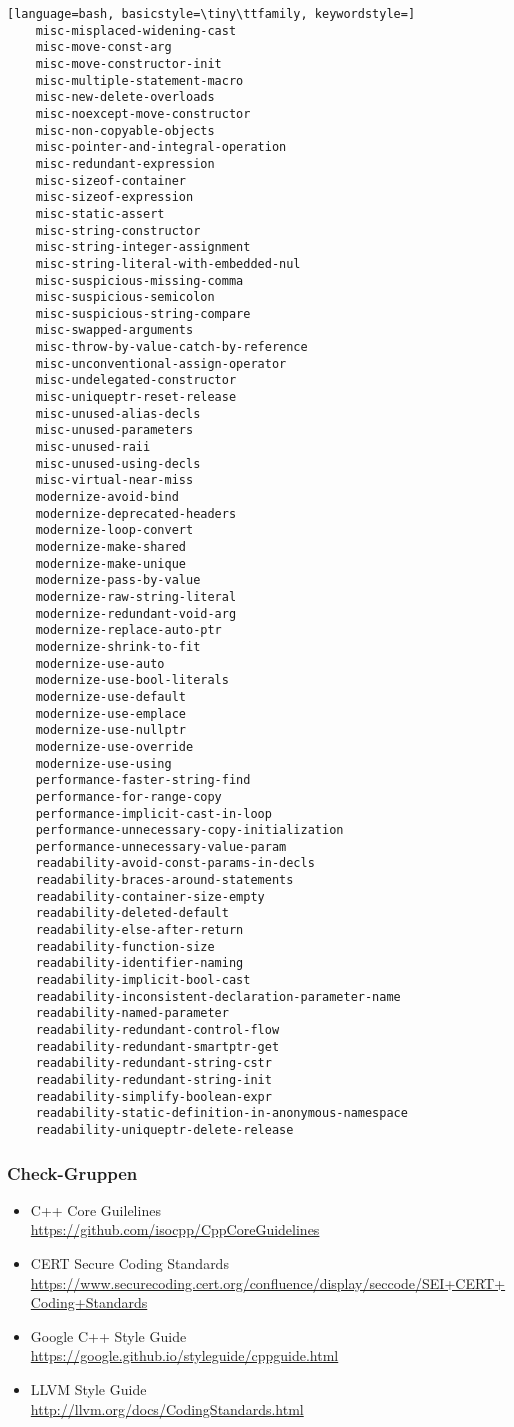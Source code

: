 \documentclass[aspectratio=169]{beamer}
\begin{document}
\begin{lstlisting}[language=bash, basicstyle=\tiny\ttfamily, keywordstyle=]
    misc-misplaced-widening-cast
    misc-move-const-arg
    misc-move-constructor-init
    misc-multiple-statement-macro
    misc-new-delete-overloads
    misc-noexcept-move-constructor
    misc-non-copyable-objects
    misc-pointer-and-integral-operation
    misc-redundant-expression
    misc-sizeof-container
    misc-sizeof-expression
    misc-static-assert
    misc-string-constructor
    misc-string-integer-assignment
    misc-string-literal-with-embedded-nul
    misc-suspicious-missing-comma
    misc-suspicious-semicolon
    misc-suspicious-string-compare
    misc-swapped-arguments
    misc-throw-by-value-catch-by-reference
    misc-unconventional-assign-operator
    misc-undelegated-constructor
    misc-uniqueptr-reset-release
    misc-unused-alias-decls
    misc-unused-parameters
    misc-unused-raii
    misc-unused-using-decls
    misc-virtual-near-miss
    modernize-avoid-bind
    modernize-deprecated-headers
    modernize-loop-convert
    modernize-make-shared
    modernize-make-unique
    modernize-pass-by-value
    modernize-raw-string-literal
    modernize-redundant-void-arg
    modernize-replace-auto-ptr
    modernize-shrink-to-fit
    modernize-use-auto
    modernize-use-bool-literals
    modernize-use-default
    modernize-use-emplace
    modernize-use-nullptr
    modernize-use-override
    modernize-use-using
    performance-faster-string-find
    performance-for-range-copy
    performance-implicit-cast-in-loop
    performance-unnecessary-copy-initialization
    performance-unnecessary-value-param
    readability-avoid-const-params-in-decls
    readability-braces-around-statements
    readability-container-size-empty
    readability-deleted-default
    readability-else-after-return
    readability-function-size
    readability-identifier-naming
    readability-implicit-bool-cast
    readability-inconsistent-declaration-parameter-name
    readability-named-parameter
    readability-redundant-control-flow
    readability-redundant-smartptr-get
    readability-redundant-string-cstr
    readability-redundant-string-init
    readability-simplify-boolean-expr
    readability-static-definition-in-anonymous-namespace
    readability-uniqueptr-delete-release
  \end{lstlisting}
\begin{frame}
  \frametitle{Check-Gruppen}
  \begin{itemize}
  \item C++ Core Guilelines\\
    \qquad \url{https://github.com/isocpp/CppCoreGuidelines}
  \item CERT Secure Coding Standards\\
    \qquad \url{https://www.securecoding.cert.org/confluence/display/seccode/SEI+CERT+Coding+Standards}
  \item Google C++ Style Guide\\
    \qquad \url{https://google.github.io/styleguide/cppguide.html}
  \item LLVM Style Guide\\
    \qquad \url{http://llvm.org/docs/CodingStandards.html}
  \end{itemize}
\end{frame}
\end{document}
